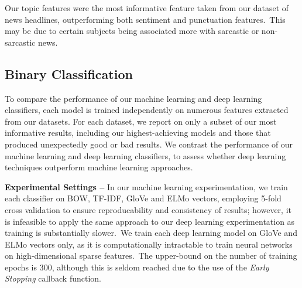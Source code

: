 \documentclass[12pt,a4paper]{article}
\begin{document}
\noindent Our topic features were the most informative feature taken from our dataset of news headlines, outperforming both sentiment and punctuation features.\ This may be due to certain subjects being associated more with sarcastic or non-sarcastic news.



\subsection{Binary Classification}\vspace{-5pt}
\noindent To compare the performance of our machine learning and deep learning classifiers, each model is trained independently on numerous features extracted from our datasets. For each dataset, we report on only a subset of our most informative results, including our highest-achieving models and those that produced unexpectedly good or bad results. We contrast the performance of our machine learning and deep learning classifiers, to assess whether deep learning techniques outperform machine learning approaches.\\\vspace{-4pt}


\noindent \textbf{Experimental Settings --} In our machine learning experimentation, we train each classifier on BOW, TF-IDF, GloVe and ELMo vectors, employing 5-fold cross validation to ensure reproducability and consistency of results; however, it is infeasible to apply the same approach to our deep learning experimentation as training is substantially slower.\ We train each deep learning model on GloVe and ELMo vectors only, as it is computationally intractable to train neural networks on high-dimensional sparse features.\ The upper-bound on the number of training epochs is 300, although this is seldom reached due to the use of the \textit{Early Stopping} callback function.\\\vspace{-10pt}

\\\vspace{-10pt}
\end{document}
